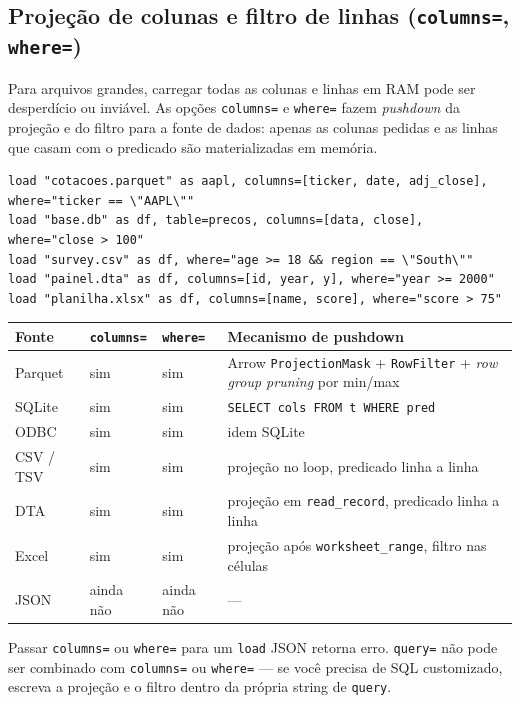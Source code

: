 \subsection*{Projeção de colunas e filtro de linhas (\texttt{columns=}, \texttt{where=})}

Para arquivos grandes, carregar todas as colunas e linhas em RAM pode ser
desperdício ou inviável. As opções \texttt{columns=} e \texttt{where=} fazem
\textit{pushdown} da projeção e do filtro para a fonte de dados: apenas as
colunas pedidas e as linhas que casam com o predicado são materializadas em
memória.

\begin{lstlisting}[caption={Pushdown de colunas e filtro}]
load "cotacoes.parquet" as aapl, columns=[ticker, date, adj_close], where="ticker == \"AAPL\""
load "base.db" as df, table=precos, columns=[data, close], where="close > 100"
load "survey.csv" as df, where="age >= 18 && region == \"South\""
load "painel.dta" as df, columns=[id, year, y], where="year >= 2000"
load "planilha.xlsx" as df, columns=[name, score], where="score > 75"
\end{lstlisting}

\begin{center}
\begin{tabular}{llll}
\toprule
\textbf{Fonte} & \textbf{\texttt{columns=}} & \textbf{\texttt{where=}} & \textbf{Mecanismo de pushdown} \\
\midrule
Parquet   & sim & sim & Arrow \texttt{ProjectionMask} + \texttt{RowFilter} + \textit{row group pruning} por min/max \\
SQLite    & sim & sim & \texttt{SELECT cols FROM t WHERE pred} \\
ODBC      & sim & sim & idem SQLite \\
CSV / TSV & sim & sim & projeção no loop, predicado linha a linha \\
DTA       & sim & sim & projeção em \texttt{read\_record}, predicado linha a linha \\
Excel     & sim & sim & projeção após \texttt{worksheet\_range}, filtro nas células \\
JSON      & ainda não & ainda não & --- \\
\bottomrule
\end{tabular}
\end{center}

Passar \texttt{columns=} ou \texttt{where=} para um \texttt{load} JSON retorna
erro. \texttt{query=} não pode ser combinado com \texttt{columns=} ou
\texttt{where=} --- se você precisa de SQL customizado, escreva a projeção e o
filtro dentro da própria string de \texttt{query}.

